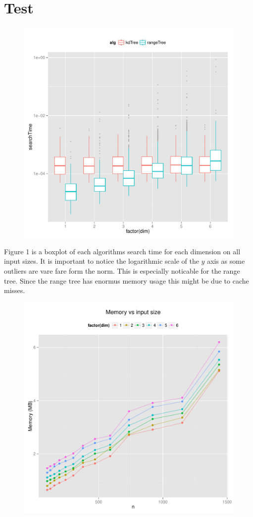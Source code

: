 \documentclass{article}
\begin{document}
 \section{Test}
\begin{figure}[H]
    \centering
    \includegraphics[width=\textwidth]{../src/R/plots/boxplot.pdf}
    \caption{}
\end{figure}
Figure 1 is a boxplot of each algorithms search time for each dimension on all 
input sizes. It is important to notice the logarithmic scale of the $y$ axis as 
some outliers are vare fare form the norm. This is especially noticable for the 
range tree. Since the range tree has enormus memory usage this might be due to 
cache misses.
\begin{figure}[H]
    \centering
    \includegraphics[width=\textwidth]{../src/R/plots/kdmem.pdf}
    \caption{}
\end{figure}
\end{document}
